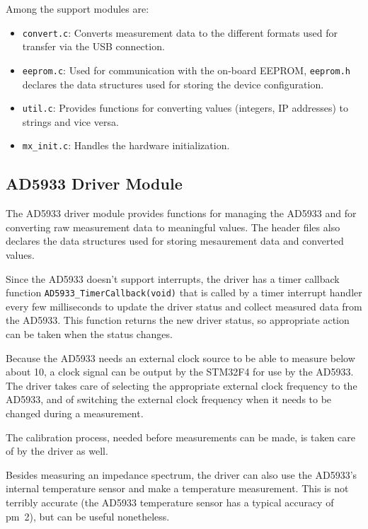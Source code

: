 Among the support modules are:
%
\begin{itemize}
	\item \verb!convert.c!: Converts measurement data to the different formats used for transfer via the USB connection.
  
  \item \verb!eeprom.c!: Used for communication with the on-board EEPROM, \verb!eeprom.h! declares the data
        structures used for storing the device configuration.
  
  \item \verb!util.c!: Provides functions for converting values (integers, IP addresses) to strings and vice versa.
  
  \item \verb!mx_init.c!: Handles the hardware initialization.
\end{itemize}


\subsection{AD5933 Driver Module}

The AD5933 driver module provides functions for managing the AD5933 and for converting raw measurement data to
meaningful values. The header files also declares the data structures used for storing mesaurement data and converted
values.

Since the AD5933 doesn't support interrupts, the driver has a timer callback function \verb!AD5933_TimerCallback(void)!
that is called by a timer interrupt handler every few milliseconds to update the driver status and collect measured
data from the AD5933. This function returns the new driver status, so appropriate action can be taken when the status
changes.

Because the AD5933 needs an external clock source to be able to measure below about \unit{10}{\kilo\hertz},
a clock signal can be output by the STM32F4 for use by the AD5933. The driver takes care of selecting the appropriate
external clock frequency to the AD5933, and of switching the external clock frequency when it needs to be changed
during a measurement.

The calibration process, needed before measurements can be made, is taken care of by the driver as well.

Besides measuring an impedance spectrum, the driver can also use the AD5933's internal temperature sensor and make a
temperature measurement. This is not terribly accurate (the AD5933 temperature sensor has a typical accuracy of
\unit{\pm 2}{\celsius}), but can be useful nonetheless.


